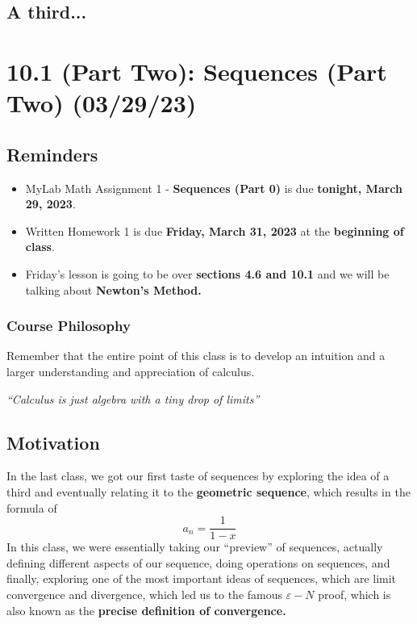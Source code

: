 \documentclass{report}
\begin{document}
\begin{sloppypar}
\section{A third...}

\chapter{10.1 (Part Two): Sequences (Part Two) (03/29/23)}
\section{Reminders}
\begin{itemize}
  \item MyLab Math Assignment 1 - \textbf{Sequences (Part 0)} is
        due \textbf{tonight, March 29, 2023}.
  \item Written Homework 1 is due \textbf{Friday, March 31,
        2023} at the \textbf{beginning of class}.
  \item Friday's lesson is going to be over \textbf{sections
        4.6 and 10.1} and we will be talking about \textbf{
        Newton's Method. }
\end{itemize}
\subsection{Course Philosophy}
Remember that the entire point of this class is to develop
an intuition and a larger understanding and appreciation of
calculus.
\begin{center}
  \textit{``Calculus is just algebra with a tiny drop of
    limits''}
\end{center}
\section{Motivation}
In the last class, we got our first taste of sequences
by exploring the idea of a third and eventually relating it
to the \textbf{geometric sequence}, which results in the formula
of
\[ a_{n} = \frac{1}{1-x}\]
In this class, we were essentially taking our ``preview'' of
sequences, actually defining different aspects of our sequence,
doing operations on sequences, and finally, exploring
one of the most important ideas of sequences, which are
limit convergence and divergence, which led us to the famous
$ \varepsilon - N $ proof, which is also known as the \textbf{precise
definition of convergence.}

\end{sloppypar}
\end{document}
